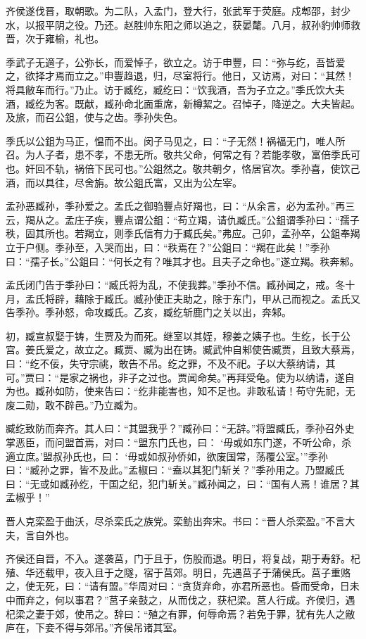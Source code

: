 \documentclass[a4paper,12pt,UTF8,twoside]{ctexbook}
\begin{document}
齐侯遂伐晋，取朝歌。为二队，入孟门，登大行，张武军于荧庭。戍郫邵，封少水，以报平阴之役。乃还。赵胜帅东阳之师以追之，获晏氂。八月，叔孙豹帅师救晋，次于雍榆，礼也。

季武子无適子，公弥长，而爱悼子，欲立之。访于申豐，曰：“弥与纥，吾皆爱之，欲择才焉而立之。”申豐趋退，归，尽室将行。他日，又访焉，对曰：“其然！将具敝车而行。”乃止。访于臧纥，臧纥曰：“饮我酒，吾为子立之。”季氏饮大夫酒，臧纥为客。既献，臧孙命北面重席，新樽絜之。召悼子，降逆之。大夫皆起。及旅，而召公鉏，使与之齿。季孙失色。

季氏以公鉏为马正，愠而不出。闵子马见之，曰：“子无然！祸福无门，唯人所召。为人子者，患不孝，不患无所。敬共父命，何常之有？若能孝敬，富倍季氏可也。奸回不轨，祸倍下民可也。”公鉏然之。敬共朝夕，恪居官次。季孙喜，使饮己酒，而以具往，尽舍旃。故公鉏氏富，又出为公左宰。

孟孙恶臧孙，季孙爱之。孟氏之御驺豐点好羯也，曰：“从余言，必为孟孙。”再三云，羯从之。孟庄子疾，豐点谓公鉏：“苟立羯，请仇臧氏。”公鉏谓季孙曰：“孺子秩，固其所也。若羯立，则季氏信有力于臧氏矣。”弗应。己卯，孟孙卒，公鉏奉羯立于户侧。季孙至，入哭而出，曰：“秩焉在？”公鉏曰：“羯在此矣！”季孙曰：“孺子长。”公鉏曰：“何长之有？唯其才也。且夫子之命也。”遂立羯。秩奔邾。

孟氏闭门告于季孙曰：“臧氏将为乱，不使我葬。”季孙不信。臧孙闻之，戒。冬十月，孟氏将辟，藉除于臧氏。臧孙使正夫助之，除于东门，甲从己而视之。孟氏又告季孙。季孙怒，命攻臧氏。乙亥，臧纥斩鹿门之关以出，奔邾。

初，臧宣叔娶于铸，生贾及为而死。继室以其姪，穆姜之姨子也。生纥，长于公宫。姜氏爱之，故立之。臧贾、臧为出在铸。臧武仲自邾使告臧贾，且致大蔡焉，曰：“纥不佞，失守宗祧，敢告不吊。纥之罪，不及不祀。子以大蔡纳请，其可。”贾曰：“是家之祸也，非子之过也。贾闻命矣。”再拜受龟。使为以纳请，遂自为也。臧孙如防，使来告曰：“纥非能害也，知不足也。非敢私请！苟守先祀，无废二勋，敢不辟邑。”乃立臧为。

臧纥致防而奔齐。其人曰：“其盟我乎？”臧孙曰：“无辞。”将盟臧氏，季孙召外史掌恶臣，而问盟首焉，对曰：“盟东门氏也，曰： ‘毋或如东门遂，不听公命，杀適立庶。’盟叔孙氏也，曰： ‘毋或如叔孙侨如，欲废国常，荡覆公室。’”季孙曰：“臧孙之罪，皆不及此。”孟椒曰：“盍以其犯门斩关？”季孙用之。乃盟臧氏曰：“无或如臧孙纥，干国之纪，犯门斩关。”臧孙闻之，曰：“国有人焉！谁居？其孟椒乎！”

晋人克栾盈于曲沃，尽杀栾氏之族党。栾鲂出奔宋。书曰：“晋人杀栾盈。”不言大夫，言自外也。

齐侯还自晋，不入。遂袭莒，门于且于，伤股而退。明日，将复战，期于寿舒。杞殖、华还载甲，夜入且于之隧，宿于莒郊。明日，先遇莒子于蒲侯氏。莒子重赂之，使无死，曰：“请有盟。”华周对曰：“贪货弃命，亦君所恶也。昏而受命，日未中而弃之，何以事君？”莒子亲鼓之，从而伐之，获杞梁。莒人行成。齐侯归，遇杞梁之妻于郊，使吊之。辞曰：“殖之有罪，何辱命焉？若免于罪，犹有先人之敝庐在，下妾不得与郊吊。”齐侯吊诸其室。
\end{document}
